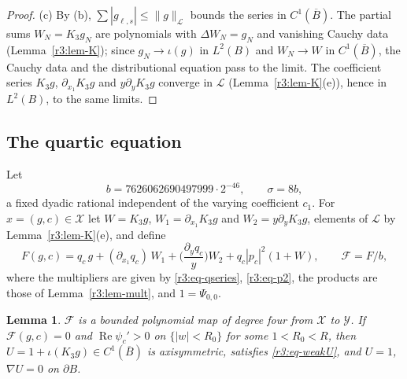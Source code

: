 \documentclass[11pt]{amsart}
\newtheorem{lemma}[theorem]{Lemma}
\theoremstyle{definition}
\theoremstyle{remark}
\numberwithin{equation}{section}
\newcommand{\Fc}{\mathcal{F}}
\DeclareMathOperator{\re}{Re}
\newcommand{\nrm}[1]{\lVert #1\rVert}
\begin{document}
\begin{proof}
(c) By (b), $\sum|g_{\ell,s}|\leq\nrm g_{\mathcal L}$ bounds the series in $C^1(\overline B)$. The partial sums $W_N=K_3g_N$ are polynomials with $\Delta W_N=g_N$ and vanishing Cauchy data (Lemma~\ref{r3:lem-K}); since $g_N\to\iota(g)$ in $L^2(B)$ and $W_N\to W$ in $C^1(\overline B)$, the Cauchy data and the distributional equation pass to the limit. The coefficient series $K_3g$, $\partial_{x_1}K_3g$ and $y\partial_yK_3g$ converge in $\mathcal L$ (Lemma~\ref{r3:lem-K}(e)), hence in $L^2(B)$, to the same limits.
\end{proof}

\subsection{The quartic equation}\label{r3:sec-quartic}

Let
\[
b=7626062690497999\cdot2^{-46},\qquad \sigma=8b,
\]
a fixed dyadic rational independent of the varying coefficient $c_1$. For $x=(g,c)\in\mathcal X$ let $W=K_3g$, $W_1=\partial_{x_1}K_3g$ and $W_2=y\partial_yK_3g$, elements of $\mathcal L$ by Lemma~\ref{r3:lem-K}(e), and define
\begin{equation}\label{r3:eq-F}
F(g,c)=q_c\,g+(\partial_{x_1}q_c)\,W_1+\Big(\frac{\partial_yq_c}y\Big)W_2+q_c|p_c|^2(1+W),\qquad \Fc=F/b,
\end{equation}
where the multipliers are given by \eqref{r3:eq-qseries}, \eqref{r3:eq-p2}, the products are those of Lemma~\ref{r3:lem-mult}, and $1=\Psi_{0,0}$.

\begin{lemma}\label{r3:lem-F}
$\Fc$ is a bounded polynomial map of degree four from $\mathcal X$ to $\mathcal Y$. If $\Fc(g,c)=0$ and $\re\psi_c'>0$ on $\{|w|<R_0\}$ for some $1<R_0<R$, then $U=1+\iota(K_3g)\in C^1(\overline B)$ is axisymmetric, satisfies \eqref{r3:eq-weakU}, and $U=1$, $\nabla U=0$ on $\partial B$.
\end{lemma}
\end{document}
